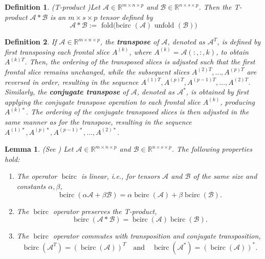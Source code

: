 \documentclass[oupthm]{CUP-JNL-BCM}%
\theoremstyle{oupplain}
\newtheorem{lemma}[theorem]{Lemma}
\theoremstyle{oupdefinition}
\newtheorem{definition}{Definition}[section]
\theoremstyle{oupremark}
\theoremstyle{oupproof}
\numberwithin{equation}{section}
\begin{document}
\begin{definition}(T-product \cite{kathrinLund})\label{tpdef}
    Let $\mathcal{A} \in \mathbb{R}^{m \times n \times p}$ and $\mathcal{B} \in \mathbb{R}^{n \times s \times p}$. Then the T-product $\mathcal{A} * \mathcal{B}$ is an $m \times s \times p$ tensor defined by
$$
\mathcal{A} * \mathcal{B}:=\text { fold(bcirc }(\mathcal{A}) \text { unfold }(\mathcal{B}))
$$ 
\end{definition}
\begin{definition}\cite{kathrinLund} 
   If \(\mathcal{A} \in \mathbb{R}^{m \times n \times p}\), the \textbf{transpose} of \(\mathcal{A}\), denoted as \(\mathcal{A}^T\), is defined by first transposing each frontal slice \(A^{(k)}\), where \(A^{(k)} = \mathcal{A}(:, :, k)\), to obtain \(A^{(k)T}\). Then, the ordering of the transposed slices is adjusted such that the first frontal slice remains unchanged, while the subsequent slices \(A^{(2)T}, \ldots, A^{(p)T}\) are reversed in order, resulting in the sequence \(A^{(1)T}, A^{(p)T}, A^{(p-1)T}, \ldots, A^{(2)T}\). Similarly, the \textbf{conjugate transpose} of \(\mathcal{A}\), denoted as \(\mathcal{A}^*\), is obtained by first applying the conjugate transpose operation to each frontal slice \(A^{(k)}\), producing \(A^{(k)*}\). The ordering of the conjugate transposed slices is then adjusted in the same manner as for the transpose, resulting in the sequence \(A^{(1)*}, A^{(p)*}, A^{(p-1)*}, \ldots, A^{(2)*}\).

\end{definition}


\begin{lemma}\label{bcircprop} (See \cite{kathrinLund})  
Let \(\mathcal{A} \in \mathbb{R}^{m \times n \times p}\) and \(\mathcal{B} \in \mathbb{R}^{n \times s \times p}\). The following properties hold:  
\begin{enumerate}


    \item The operator \(\operatorname{bcirc}\) is linear, i.e., for tensors \(\mathcal{A}\) and \(\mathcal{B}\) of the same size and constants \(\alpha, \beta\),  
\[
\operatorname{bcirc}(\alpha \mathcal{A} + \beta \mathcal{B}) = \alpha \operatorname{bcirc}(\mathcal{A}) + \beta \operatorname{bcirc}(\mathcal{B}).
\]  
    \item The \(\operatorname{bcirc}\) operator preserves the T-product,  
\[
\operatorname{bcirc}(\mathcal{A} * \mathcal{B}) = \operatorname{bcirc}(\mathcal{A}) \operatorname{bcirc}(\mathcal{B}).
\]  
    \item  The \(\operatorname{bcirc}\) operator commutes with transposition and conjugate transposition,  
\[
\operatorname{bcirc}\left(\mathcal{A}^T\right) = \left(\operatorname{bcirc}(\mathcal{A})\right)^T \quad \text{and} \quad \operatorname{bcirc}\left(\mathcal{A}^*\right) = \left(\operatorname{bcirc}(\mathcal{A})\right)^*.
\]
\end{enumerate}

\end{lemma}
    
\end{document}
